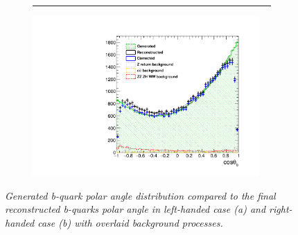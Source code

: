 \begin{figure}
\begin{subfigure}{0.5\textwidth}
{{				\rule{0ex}{0.38in}%
			}
			\rule{1.8in}{0ex}}
		\caption{\label{fig:BAsymmetryFinal_a_3F} }
	\end{subfigure}%
	\begin{subfigure}{0.5\textwidth}
		\centering
		\includegraphics[width=0.95\textwidth]{ILD/plots/basymmetry-final-right.pdf}
		\caption{\label{fig:BAsymmetryFinal_b_3F} }
	\end{subfigure}
	\caption{\sl Generated b-quark polar angle distribution compared to the final reconstructed b-quarks polar angle in left-handed case (a) and right-handed case (b) with overlaid background processes.  }
	\label{fig:BAsymmetryFinal_3F}
\end{figure}



